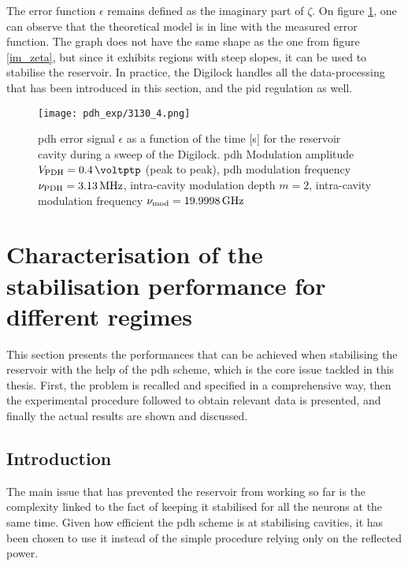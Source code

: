 The error function $\epsilon$ remains defined as the imaginary part of $\zeta$. On figure \ref{pdh_exp}, one can observe that the theoretical model is in line with the measured error function. The graph does not have the same shape as the one from figure \ref{im_zeta}, but since it exhibits regions with steep slopes, it can be used to stabilise the reservoir. In practice, the Digilock handles all the data-processing that has been introduced in this section, and the \gls{pid} regulation as well.

\begin{figure}
	\centering
	\texttt{[image: pdh\_exp/3130\_4.png]}
	\caption{\gls{pdh} error signal $\epsilon$ as a function of the time [s] for the reservoir cavity during a sweep of the Digilock. \gls{pdh} Modulation amplitude $\tind{V}{PDH}= \SI{0.4}{\voltptp}$ (peak to peak), \gls{pdh} modulation frequency $\nu_{\text{PDH}} = \SI{3.13}{\mega\hertz}$, intra-cavity modulation depth $m=2$, intra-cavity modulation frequency $\nu_{\text{mod}} = \SI{19.9998}{\giga\hertz}$}
	\label{pdh_exp}
\end{figure}


\section{Characterisation of the stabilisation performance for different regimes}

This section presents the performances that can be achieved when stabilising the reservoir with the help of the \gls{pdh} scheme, which is the core issue tackled in this thesis. First, the problem is recalled and specified in a comprehensive way, then the experimental procedure followed to obtain relevant data is presented, and finally the actual results are shown and discussed.


\subsection{Introduction}

The main issue that has prevented the reservoir from working so far is the complexity linked to the fact of keeping it stabilised for all the neurons at the same time. Given how efficient the \gls{pdh} scheme is at stabilising cavities, it has been chosen to use it instead of the simple procedure relying only on the reflected power. \\

